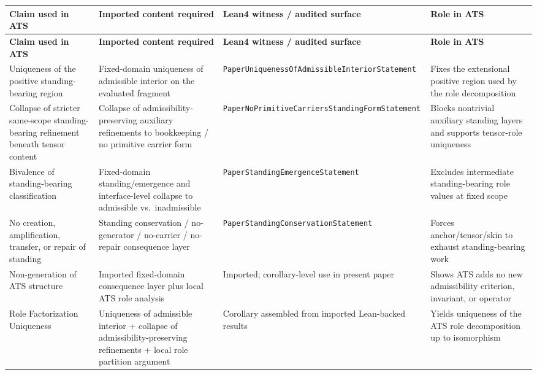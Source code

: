 \documentclass[12pt]{article}
\theoremstyle{plain}
\begin{document}
{\footnotesize
\renewcommand{\arraystretch}{1.15}
\begin{longtable}{@{}p{}p{}p{}p{}@{}}
\toprule
\textbf{Claim used in ATS} & \textbf{Imported content required} & \textbf{Lean4 witness / audited surface} & \textbf{Role in ATS}\\
\midrule
\endfirsthead
\toprule
\textbf{Claim used in ATS} & \textbf{Imported content required} & \textbf{Lean4 witness / audited surface} & \textbf{Role in ATS}\\
\midrule
\endhead
Uniqueness of the positive standing-bearing region & Fixed-domain uniqueness of admissible interior on the evaluated fragment & \texttt{PaperUniquenessOfAdmissibleInteriorStatement} & Fixes the extensional positive region used by the role decomposition\\
Collapse of stricter same-scope standing-bearing refinement beneath tensor content & Collapse of admissibility-preserving auxiliary refinements to bookkeeping / no primitive carrier form & \texttt{PaperNoPrimitiveCarriersStandingFormStatement} & Blocks nontrivial auxiliary standing layers and supports tensor-role uniqueness\\
Bivalence of standing-bearing classification & Fixed-domain standing/emergence and interface-level collapse to admissible vs.\ inadmissible & \texttt{PaperStandingEmergenceStatement} & Excludes intermediate standing-bearing role values at fixed scope\\
No creation, amplification, transfer, or repair of standing & Standing conservation / no-generator / no-carrier / no-repair consequence layer & \texttt{PaperStandingConservationStatement} & Forces anchor/tensor/skin to exhaust standing-bearing work\\
Non-generation of ATS structure & Imported fixed-domain consequence layer plus local ATS role analysis & Imported; corollary-level use in present paper & Shows ATS adds no new admissibility criterion, invariant, or operator\\
Role Factorization Uniqueness & Uniqueness of admissible interior + collapse of admissibility-preserving refinements + local role partition argument & Corollary assembled from imported Lean-backed results & Yields uniqueness of the ATS role decomposition up to isomorphism\\
\bottomrule
\end{longtable}
}
\end{document}
